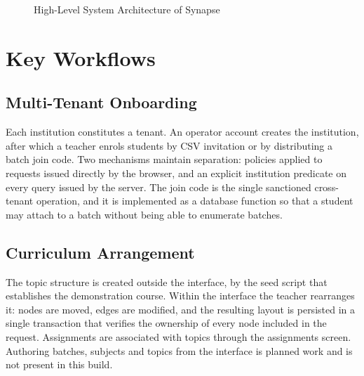\begin{figure}[H]
{
    }
    \caption{High-Level System Architecture of Synapse}
    \label{fig:system_arch}
\end{figure}

\section{Key Workflows}

\subsection{Multi-Tenant Onboarding}

Each institution constitutes a tenant. An operator account creates the institution, after which a teacher enrols students by CSV invitation or by distributing a batch join code. Two mechanisms maintain separation: policies applied to requests issued directly by the browser, and an explicit institution predicate on every query issued by the server. The join code is the single sanctioned cross-tenant operation, and it is implemented as a database function so that a student may attach to a batch without being able to enumerate batches.

\subsection{Curriculum Arrangement}

The topic structure is created outside the interface, by the seed script that establishes the demonstration course. Within the interface the teacher rearranges it: nodes are moved, edges are modified, and the resulting layout is persisted in a single transaction that verifies the ownership of every node included in the request. Assignments are associated with topics through the assignments screen. Authoring batches, subjects and topics from the interface is planned work and is not present in this build.

